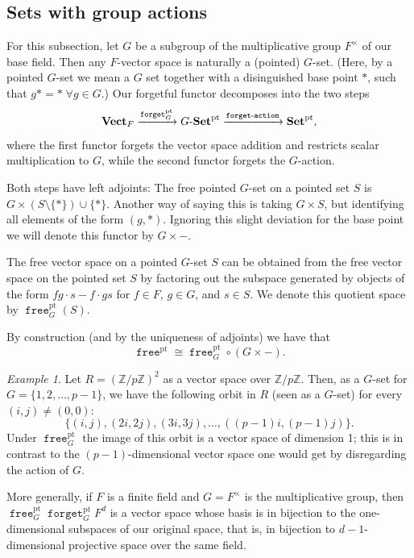 \documentclass[a4paper]{amsart}
\theoremstyle{plain}
\theoremstyle{definition}
\theoremstyle{remark}
\newtheorem{example}[theorem]{Example}
\newcommand{\funct}[1]{\operatorname{\mathtt{#1}}}
\newcommand{\pSet}{\mathbf{Set}^\mathrm{pt}}
\newcommand{\VectF}{\mathbf{Vect}_F}
\newcommand{\Z}{\mathbb{Z}}
\begin{document}
\subsection{Sets with group actions}
\label{sec.groupac}

For this subsection, let \( G \) be a subgroup of the multiplicative group \( F^{\times} \) of our base field. Then any \( F \)-vector space is naturally a (pointed) \( G \)-set. (Here, by a pointed \( G \)-set we mean a \( G \) set together with a disinguished base point $*$, such that $g* = * \; \forall g \in G$.) Our forgetful functor decomposes into the two steps
\[ \VectF \xrightarrow{\funct{forget}^\mathrm{pt}_G} G\text -\pSet \xrightarrow{\funct{forget-action}} \pSet, \]
where the first functor forgets the vector space addition and restricts scalar multiplication to $G$, while the second functor forgets the $G$-action.

Both steps have left adjoints: The free pointed \( G \)-set on a pointed set \( S \) is \( G \times (S \setminus \{ * \}) \cup \{ * \} \). Another way of saying this is taking \( G \times S \), but identifying all elements of the form \( (g, * ) \). Ignoring this slight deviation for the base point we will denote this functor by \( G \times - \).

The free vector space on a pointed \( G \)-set \( S \) can be obtained from the free vector space on the pointed set \( S \) by factoring out the subspace generated by objects of the form \( fg \cdot s - f \cdot gs \) for \( f \in F \), \( g \in G \), and \( s \in S \). We denote this quotient space by \( \funct{free}^\mathrm{pt}_G(S) \).

By construction (and by the uniqueness of adjoints) we have that
\[ \funct{free}^\mathrm{pt} \cong \funct{free}^\mathrm{pt}_G \circ (G \times - ). \]

\begin{example}\label{ex.D4-2}
Let $R=(\Z/p\Z)^2$ as a vector space over $\Z/p\Z$. Then, as a $G$-set for $G=\{1,2, \ldots, p-1\}$, we have the following orbit in $R$ (seen as a $G$-set) for every $(i,j)\neq (0,0)$:
\[
\{(i,j), (2i,2j), (3i, 3j), \ldots, ((p-1)i, (p-1)j)\}.
\]
Under $\funct{free}^\mathrm{pt}_G$ the image of this orbit is a vector space of dimension 1; this is in contrast to the $(p-1)$-dimensional vector space one would get by disregarding the action of $G$.

More generally, if $F$ is a finite field and $G = F^{\times}$ is the multiplicative group, then
\( \funct{free}^\mathrm{pt}_G \funct{forget}^\mathrm{pt}_G F^d \) is a vector space whose basis is in bijection to the one-dimensional subspaces of our original space, that is, in bijection to $d-1$-dimensional projective space over the same field.
\end{example}
\end{document}
